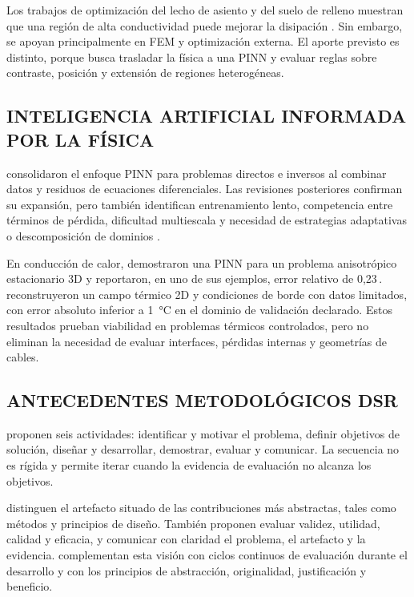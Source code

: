 \documentclass[11pt,a4paper,oneside]{report}
\newcommand{\pct}{\mbox{\char37}}
\begin{document}
Los trabajos de optimización del lecho de asiento y del suelo de relleno muestran que una región de alta conductividad puede mejorar la disipación \parencites[1--3]{oclon2015}[1--4]{atoccsa2024}. Sin embargo, se apoyan principalmente en FEM y optimización externa. El aporte previsto es distinto, porque busca trasladar la física a una PINN y evaluar reglas sobre contraste, posición y extensión de regiones heterogéneas.

\subsection{INTELIGENCIA ARTIFICIAL INFORMADA POR LA FÍSICA}

\textcite[686--690]{raissi2019} consolidaron el enfoque PINN para problemas directos e inversos al combinar datos y residuos de ecuaciones diferenciales. Las revisiones posteriores confirman su expansión, pero también identifican entrenamiento lento, competencia entre términos de pérdida, dificultad multiescala y necesidad de estrategias adaptativas o descomposición de dominios \parencites[1--2,14--17]{lawal2022}[2--6]{ren2025}.

En conducción de calor, \textcite[1,3,17]{xing2023} demostraron una PINN para un problema anisotrópico estacionario 3D y reportaron, en uno de sus ejemplos, error relativo de 0,23\,\pct. \textcite[1,3,16]{pan2025} reconstruyeron un campo térmico 2D y condiciones de borde con datos limitados, con error absoluto inferior a \SI{1}{\celsius} en el dominio de validación declarado. Estos resultados prueban viabilidad en problemas térmicos controlados, pero no eliminan la necesidad de evaluar interfaces, pérdidas internas y geometrías de cables.

\subsection{ANTECEDENTES METODOLÓGICOS DSR}

\textcite[54--56]{peffers2007} proponen seis actividades: identificar y motivar el problema, definir objetivos de solución, diseñar y desarrollar, demostrar, evaluar y comunicar. La secuencia no es rígida y permite iterar cuando la evidencia de evaluación no alcanza los objetivos.

\textcite[342--350]{gregor2013} distinguen el artefacto situado de las contribuciones más abstractas, tales como métodos y principios de diseño. También proponen evaluar validez, utilidad, calidad y eficacia, y comunicar con claridad el problema, el artefacto y la evidencia. \textcite[198--203]{delport2024} complementan esta visión con ciclos continuos de evaluación durante el desarrollo y con los principios de abstracción, originalidad, justificación y beneficio.
\end{document}
